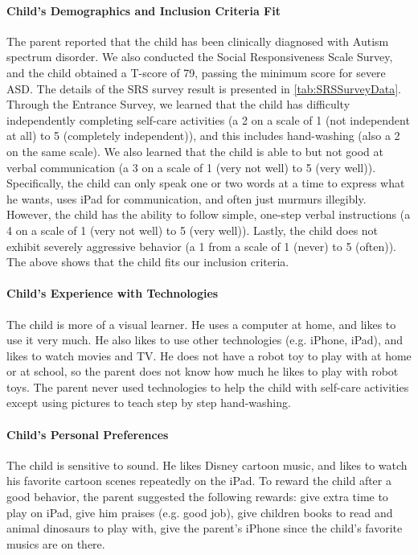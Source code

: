 \documentclass{ut-thesis}
\begin{document}
\paragraph{Child's Demographics and Inclusion Criteria Fit}
The parent reported that the child has been clinically diagnosed with Autism spectrum disorder.  We also conducted the Social Responsiveness Scale Survey, and the child obtained a T-score of 79, passing the minimum score for severe ASD.  The details of the SRS survey result is presented in \ref{tab:SRSSurveyData}.  Through the Entrance Survey, we learned that the child has difficulty independently completing self-care activities (a 2 on a scale of 1 (not independent at all) to 5 (completely independent)), and this includes hand-washing (also a 2 on the same scale).  We also learned that the child is able to but not good at verbal communication (a 3 on a scale of 1 (very not well) to 5 (very well)).  Specifically, the child can only speak one or two words at a time to express what he wants, uses iPad for communication, and often just murmurs illegibly.  However, the child has the ability to follow simple, one-step verbal instructions (a 4 on a scale of 1 (very not well) to 5 (very well)).  Lastly, the child does not exhibit severely aggressive behavior (a 1 from a scale of 1 (never) to 5 (often)).  The above shows that the child fits our inclusion criteria.

\paragraph{Child's Experience with Technologies}
The child is more of a visual learner.  He uses a computer at home, and likes to use it very much.  He also likes to use other technologies (e.g. iPhone, iPad), and likes to watch movies and TV.  He does not have a robot toy to play with at home or at school, so the parent does not know how much he likes to play with robot toys.  The parent never used technologies to help the child with self-care activities except using pictures to teach step by step hand-washing.

\paragraph{Child's Personal Preferences}
The child is sensitive to sound.  He likes Disney cartoon music, and likes to watch his favorite cartoon scenes repeatedly on the iPad.  To reward the child after a good behavior, the parent suggested the following rewards: give extra time to play on iPad, give him praises (e.g. good job), give children books to read and animal dinosaurs to play with, give the parent's iPhone since the child's favorite musics are on there.
\end{document}
